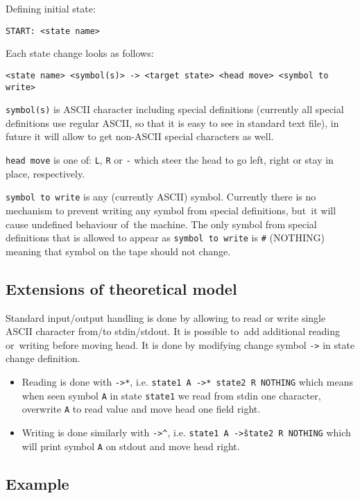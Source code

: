 \documentclass[english,shortabstract,mgr]{iithesis}
\begin{document}
Defining initial state:
\begin{verbatim}
START: <state name>
\end{verbatim}

Each state change looks as follows:
\begin{verbatim}
<state name> <symbol(s)> -> <target state> <head move> <symbol to write>
\end{verbatim}

\texttt{symbol(s)} is ASCII character including special definitions (currently
all special definitions use regular ASCII, so that it is easy to see
in standard text file), in future it will allow to get non-ASCII special
characters as well.

\texttt{head move} is one of: \texttt{L}, \texttt{R} or \texttt{-} which
steer the head to go left, right or stay in place, respectively.

\texttt{symbol to write} is any (currently ASCII) symbol. Currently there
is no mechanism to prevent writing any symbol from special definitions,
but~it will cause undefined behaviour of~the machine. The only symbol
from special definitions that is allowed to appear as \texttt{symbol to write}
is \texttt{\#} (NOTHING) meaning that symbol on the tape should not change.

\subsection {Extensions of theoretical model}

Standard input/output handling is done by allowing to read or write single
ASCII character from/to stdin/stdout. It is possible to~add additional
reading or~writing before moving head. It is done by modifying change
symbol \texttt{->} in state change definition.
\begin{itemize}
  \item Reading is done with \texttt{->*}, i.e. \texttt{state1 A ->* state2 R NOTHING}
        which means when seen symbol \texttt{A} in state \texttt{state1} we read
        from stdin one character, overwrite \texttt{A} to read value and move
        head one field right.
  \item Writing is done similarly with \texttt{->\^},
        i.e. \texttt{state1 A ->\^ state2 R NOTHING} which will print symbol
        \texttt{A} on stdout and move head right.
\end{itemize}

\subsection{Example}
\end{document}
